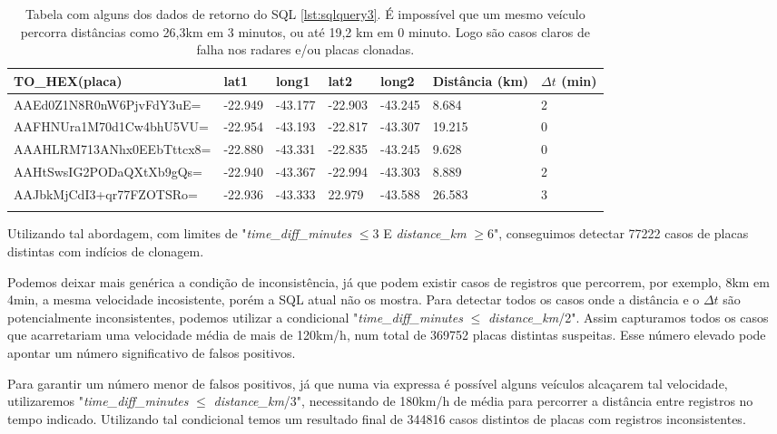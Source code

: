 \documentclass{article}
\begin{document}
\begin{longtable}{|l|l|l|l|l|l|l|}
\hline
TO\_HEX(placa)  & lat1 & long1 & lat2 & long2 & Distância (km) & $\Delta t$ (min)  \\ \hline
AAEd0Z1N8R0nW6PjvFdY3uE= & -22.949    & -43.177    & -22.903 & -43.245 & 8.684  & 2         \\ \hline
AAFHNUra1M70d1Cw4bhU5VU= & -22.954 & -43.193   & -22.817 & -43.307    & 19.215 & 0    \\ \hline
AAAHLRM713ANhx0EEbTttcx8= & -22.880 & -43.331   & -22.835 & -43.245  & 9.628 & 0    \\ \hline
AAHtSwsIG2PODaQXtXb9gQs= & -22.940 & -43.367   & -22.994 & -43.303   & 8.889 & 2   \\ \hline
AAJbkMjCdI3+qr77FZOTSRo= & -22.936 & -43.333   & 22.979 & -43.588  & 26.583 & 3  \\ \hline
\caption{\label{tab:results1}  Tabela com alguns dos dados de retorno do SQL \ref{lst:sqlquery3}. É impossível que um mesmo veículo percorra distâncias como 26,3km em 3 minutos, ou até 19,2 km em 0 minuto. Logo são casos claros de falha nos radares e/ou placas clonadas.}
\end{longtable}

Utilizando tal abordagem, com limites de "\textit{time\_diff\_minutes} $\leq 3 $ E \textit{distance\_km} $ \geq 6$", conseguimos detectar 77222 casos de placas distintas com indícios de clonagem.

Podemos deixar mais genérica a condição de inconsistência, já que podem existir casos de registros que percorrem, por exemplo, 8km em 4min, a mesma velocidade incosistente, porém a SQL atual não os mostra. Para detectar todos os casos onde a distância e o $\Delta t$ são potencialmente inconsistentes, podemos utilizar a condicional "\textit{time\_diff\_minutes} $\leq$ \textit{distance\_km}/2". Assim capturamos todos os casos que acarretariam uma velocidade média de mais de 120km/h, num total de 369752 placas distintas suspeitas. Esse número elevado pode apontar um número significativo de falsos positivos.

Para garantir um número menor de falsos positivos, já que numa via expressa é possível alguns veículos alcaçarem tal velocidade, utilizaremos "\textit{time\_diff\_minutes} $\leq$ \textit{distance\_km}/3", necessitando de 180km/h de média para percorrer a distância entre registros no tempo indicado. Utilizando tal condicional temos um resultado final de 344816 casos distintos de placas com registros inconsistentes.
\end{document}
